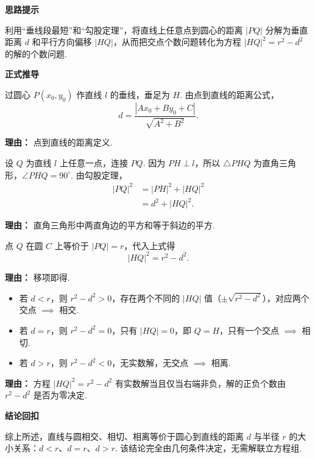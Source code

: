 \begin{proofbox}
	\textbf{\textcolor{CProof}{思路提示}}

	利用“垂线段最短”和“勾股定理”，将直线上任意点到圆心的距离 $|PQ|$ 分解为垂直距离 $d$ 和平行方向偏移 $|HQ|$，从而把交点个数问题转化为方程 $|HQ|^2 = r^2-d^2$ 的解的个数问题.

	\medskip
	\textbf{\textcolor{CProof}{正式推导}}
	\begin{description}[style=nextline, leftmargin=2.8em, labelsep=0.5em, itemsep=0.55em]
		\item[\textbf{步骤一（计算垂距）：}] 过圆心 $P(x_0,y_0)$ 作直线 $l$ 的垂线，垂足为 $H$. 由点到直线的距离公式，
			\[
				d = \frac{|Ax_0+By_0+C|}{\sqrt{A^2+B^2}}.
			\]
			\par\textbf{理由：} 点到直线的距离定义.

		\item[\textbf{步骤二（构造直角三角形）：}] 设 $Q$ 为直线 $l$ 上任意一点，连接 $PQ$. 因为 $PH\perp l$，所以 $\triangle PHQ$ 为直角三角形，$\angle PHQ = 90^\circ$. 由勾股定理，
			\[
				\begin{aligned}
					|PQ|^2 &= |PH|^2 + |HQ|^2 \\
					&= d^2 + |HQ|^2.
			\end{aligned}
			\]
			\par\textbf{理由：} 直角三角形中两直角边的平方和等于斜边的平方.

		\item[\textbf{步骤三（讨论方程解）：}] 点 $Q$ 在圆 $C$ 上等价于 $|PQ|=r$，代入上式得
			\[
				|HQ|^2 = r^2 - d^2.
			\]
			\par\textbf{理由：} 移项即得.
			\begin{itemize}[leftmargin=*, itemsep=0.3em, topsep=0.2em]
			\item 若 $d<r$，则 $r^2-d^2>0$，存在两个不同的 $|HQ|$ 值（$\pm\sqrt{r^2-d^2}$），对应两个交点 $\implies$ 相交.
			\item 若 $d=r$，则 $r^2-d^2=0$，只有 $|HQ|=0$，即 $Q=H$，只有一个交点 $\implies$ 相切.
			\item 若 $d>r$，则 $r^2-d^2<0$，无实数解，无交点 $\implies$ 相离.
		\end{itemize}
			\par\textbf{理由：} 方程 $|HQ|^2 = r^2-d^2$ 有实数解当且仅当右端非负，解的正负个数由 $r^2-d^2$ 是否为零决定.
	\end{description}

	\medskip
	\textbf{\textcolor{CProof}{结论回扣}}

	综上所述，直线与圆相交、相切、相离等价于圆心到直线的距离 $d$ 与半径 $r$ 的大小关系：$d<r$、$d=r$、$d>r$. 该结论完全由几何条件决定，无需解联立方程组.
\end{proofbox}
